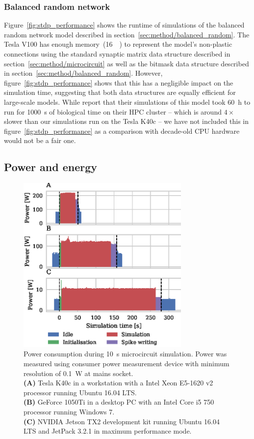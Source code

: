 \documentclass[utf8]{frontiersSCNS} %
\begin{document}
\subsubsection{Balanced random network}
Figure~\ref{fig:stdp_performance} shows the runtime of simulations of the balanced random network model described in section~\ref{sec:method/balanced_random}.
The Tesla V100 has enough memory~(\SI{16}{\giga\byte}) to represent the model's non-plastic connections using the standard synaptic matrix data structure described in section~\ref{sec:method/microcircuit} as well as the bitmask data structure described in section~\ref{sec:method/balanced_random}.
However, figure~\ref{fig:stdp_performance} shows that this has a negligible impact on the simulation time, suggesting that both data structures are equally efficient for large-scale models.
While \citet{Morrison2007} report that their simulations of this model took \SI{60}{\hour} to run for \SI{1000}{\second} of biological time on their HPC cluster -- which is around $4\times$ slower than our simulations run on the Tesla K40c -- we have not included this in figure~\ref{fig:stdp_performance} as a comparison with decade-old CPU hardware would not be a fair one.


\subsection{Power and energy}
\label{sec:results/power}
\begin{figure}
    \begin{center}
        \includegraphics[width=85mm]{figures/microcircuit_power}
    \end{center}
    \caption{Power consumption during \SI{10}{\second} microcircuit simulation.
    Power was measured using consumer power measurement device with minimum resolution of \SI{0.1}{\watt} at mains socket.\\
    \textbf{(A)} Tesla K40c in a workstation with a Intel Xeon E5-1620 v2 processor running Ubuntu 16.04 LTS.\\
    \textbf{(B)} GeForce 1050Ti in a desktop PC with an Intel Core i5 750 processor running Windows 7.\\
    \textbf{(C)} NVIDIA Jetson TX2 development kit running Ubuntu 16.04 LTS and JetPack 3.2.1 in maximum performance mode.}
    \label{fig:microcircuit_power}
\end{figure}
\end{document}
